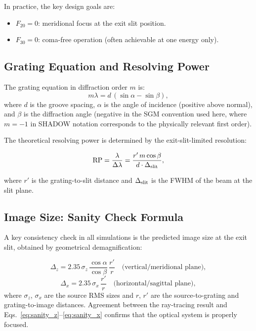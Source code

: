 \documentclass[12pt,a4paper]{article}
\newcommand{\al}{\alpha}
\newcommand{\be}{\beta}
\newcommand{\la}{\lambda}
\newcommand{\RP}{\mathrm{RP}}
\begin{document}
In practice, the key design goals are:
\begin{itemize}
  \item $F_{20} = 0$: meridional focus at the exit slit position.
  \item $F_{30} = 0$: coma-free operation (often achievable at one energy only).
\end{itemize}

\subsection{Grating Equation and Resolving Power}

The grating equation in diffraction order $m$ is:
\begin{equation}
  m\la = d\,(\sin\al - \sin\be),
  \label{eq:grating}
\end{equation}
where $d$ is the groove spacing, $\al$ is the angle of incidence (positive above normal),
and $\be$ is the diffraction angle (negative in the SGM convention used here, where
$m = -1$ in SHADOW notation corresponds to the physically relevant first order).

The theoretical resolving power is determined by the exit-slit-limited resolution:
\begin{keyresult}
\begin{equation}
  \RP = \frac{\la}{\Delta\la}
       = \frac{r'\,m\cos\be}{d\cdot\Delta_{\rm slit}},
  \label{eq:RP}
\end{equation}
\end{keyresult}
where $r'$ is the grating-to-slit distance and $\Delta_{\rm slit}$ is the FWHM of the
beam at the slit plane.

\subsection{Image Size: Sanity Check Formula}

A key consistency check in all simulations is the predicted image size at the exit slit,
obtained by geometrical demagnification:

\begin{equation}
  \Delta_z = 2.35\,\sigma_z\,\frac{\cos\al}{\cos\be}\,\frac{r'}{r}
  \quad\text{(vertical/meridional plane)},
  \label{eq:sanity_z}
\end{equation}
\begin{equation}
  \Delta_x = 2.35\,\sigma_x\,\frac{r'}{r}
  \quad\text{(horizontal/sagittal plane)},
  \label{eq:sanity_x}
\end{equation}
where $\sigma_z$, $\sigma_x$ are the source RMS sizes and $r$, $r'$ are the
source-to-grating and grating-to-image distances.  Agreement between the ray-tracing
result and Eqs.~\eqref{eq:sanity_z}--\eqref{eq:sanity_x} confirms that the optical system
is properly focused.
\end{document}
